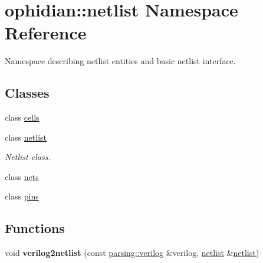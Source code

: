 \hypertarget{namespaceophidian_1_1netlist}{\section{ophidian\-:\-:netlist Namespace Reference}
\label{namespaceophidian_1_1netlist}
}


Namespace describing netlist entities and basic netlist interface.  


\subsection*{Classes}
\begin{DoxyCompactItemize}
\item 
class \hyperlink{classophidian_1_1netlist_1_1cells}{cells}
\item 
class \hyperlink{classophidian_1_1netlist_1_1netlist}{netlist}
\begin{DoxyCompactList}\small\item\em Netlist class. \end{DoxyCompactList}\item 
class \hyperlink{classophidian_1_1netlist_1_1nets}{nets}
\item 
class \hyperlink{classophidian_1_1netlist_1_1pins}{pins}
\end{DoxyCompactItemize}
\subsection*{Functions}
\begin{DoxyCompactItemize}
\item 
\hypertarget{namespaceophidian_1_1netlist_a84e95c03fffb84042653bd8b3a581812}{void {\bfseries verilog2netlist} (const \hyperlink{classophidian_1_1parsing_1_1verilog}{parsing\-::verilog} \&verilog, \hyperlink{classophidian_1_1netlist_1_1netlist}{netlist} \&\hyperlink{classophidian_1_1netlist_1_1netlist}{netlist})}\label{namespaceophidian_1_1netlist_a84e95c03fffb84042653bd8b3a581812}

\end{DoxyCompactItemize}

